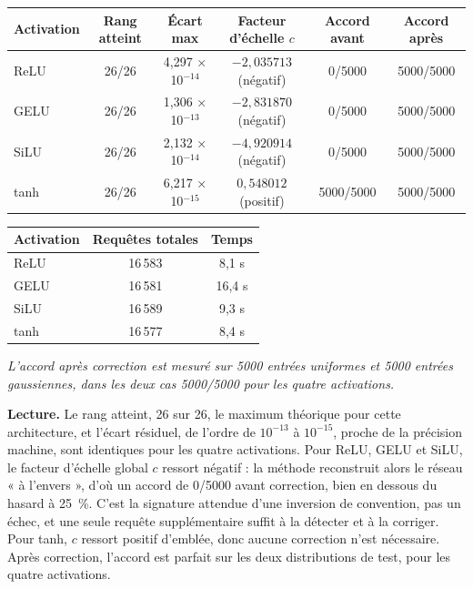 \documentclass[11pt]{article}
\begin{document}
\begin{table}[h]
\centering
\small
\begin{tabular}{lccccc}
\toprule
Activation & Rang atteint & Écart max & Facteur d'échelle $c$ & Accord avant & Accord après \\
\midrule
ReLU & 26/26 & 4,297 × 10$^{-14}$ & $-2{,}035713$ (négatif) & 0/5000 & 5000/5000 \\
GELU & 26/26 & 1,306 × 10$^{-13}$ & $-2{,}831870$ (négatif) & 0/5000 & 5000/5000 \\
SiLU & 26/26 & 2,132 × 10$^{-14}$ & $-4{,}920914$ (négatif) & 0/5000 & 5000/5000 \\
tanh & 26/26 & 6,217 × 10$^{-15}$ & $0{,}548012$ (positif) & 5000/5000 & 5000/5000 \\
\bottomrule
\end{tabular}

\vspace{0.3em}
\begin{tabular}{lcc}
\toprule
Activation & Requêtes totales & Temps \\
\midrule
ReLU & 16\,583 & 8,1 s \\
GELU & 16\,581 & 16,4 s \\
SiLU & 16\,589 & 9,3 s \\
tanh & 16\,577 & 8,4 s \\
\bottomrule
\end{tabular}
\end{table}
\par\noindent\small\textit{L'accord après correction est mesuré sur 5000 entrées uniformes et 5000 entrées gaussiennes, dans les deux cas 5000/5000 pour les quatre activations.}\normalsize\par

\textbf{Lecture.} Le rang atteint, 26 sur 26, le maximum théorique pour cette architecture, et l'écart résiduel, de l'ordre de $10^{-13}$ à $10^{-15}$, proche de la précision machine, sont identiques pour les quatre activations. Pour ReLU, GELU et SiLU, le facteur d'échelle global $c$ ressort négatif : la méthode reconstruit alors le réseau « à l'envers », d'où un accord de 0/5000 avant correction, bien en dessous du hasard à 25~\%. C'est la signature attendue d'une inversion de convention, pas un échec, et une seule requête supplémentaire suffit à la détecter et à la corriger. Pour tanh, $c$ ressort positif d'emblée, donc aucune correction n'est nécessaire. Après correction, l'accord est parfait sur les deux distributions de test, pour les quatre activations.
\end{document}

